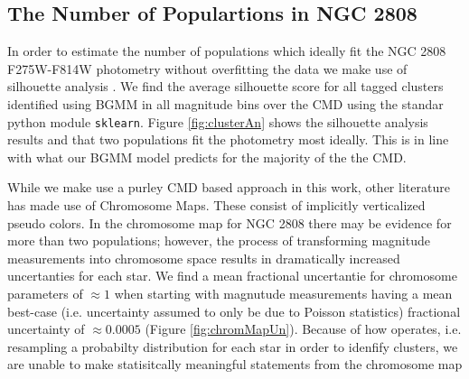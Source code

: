 \subsection{The Number of Populartions in NGC 2808}
In order to estimate the number of populations which ideally fit the NGC 2808
F275W-F814W photometry without overfitting the data we make use of silhouette
analysis \citep[][and in a similar manner to how \citet{Valle2022} preform
their analysis of spectroscopic data]{ROUSSEEUW198753}. We find the average
silhouette score for all tagged clusters identified using BGMM in all magnitude
bins over the CMD using the standar python module \texttt{sklearn}. Figure
\ref{fig:clusterAn} shows the silhouette analysis results and that two
populations fit the photometry most ideally. This is in line with what our BGMM
model predicts for the majority of the the CMD.

While we make use a purley CMD based approach in this work, other
literature has made use of Chromosome Maps. These consist of implicitly
verticalized pseudo colors. In the chromosome map for NGC 2808 there may be
evidence for more than two populations; however, the process of transforming
magnitude measurements into chromosome space results in dramatically increased
uncertanties for each star. We find a mean fractional uncertantie for
chromosome parameters of $\approx1$ when starting with magnutude
measurements having a mean best-case (i.e. uncertainty assumed to only be due
to Poisson statistics) fractional uncertainty of $\approx 0.0005$ (Figure \ref{fig:chromMapUn}). Because of
how \fidanka operates, i.e. resampling a probabilty distribution for each star
in order to idenfify clusters, we are unable to make statisitcally meaningful
statements from the chromosome map

